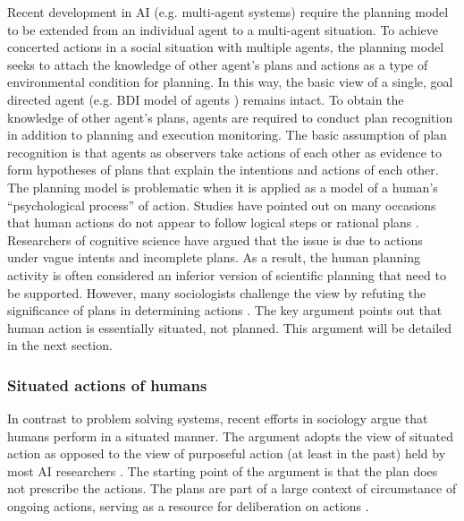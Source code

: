 
Recent development in \ac{AI} (e.g. multi-agent systems) require the planning model to be extended from an individual agent to a multi-agent situation. To achieve concerted actions in a social situation with multiple agents, the planning model seeks to attach the knowledge of other agent's plans and actions as a type of environmental condition for planning. In this way, the basic view of a single, goal directed agent (e.g. BDI model of agents \citep{Georgeff1999}) remains intact. To obtain the knowledge of other agent's plans, agents are required to conduct plan recognition in addition to planning and execution monitoring. The basic assumption of plan recognition is that agents as observers take actions of each other as evidence to form hypotheses of plans that explain the intentions and actions of each other.  \\

The planning model is problematic when it is applied as a model of a  human's ``psychological process'' of action. Studies have pointed out on many occasions that human actions do not appear to follow logical steps or rational plans \citep{Suchman1987}. Researchers of cognitive science have argued that the issue is due to actions under vague intents and incomplete plans. As a result, the human planning activity is often considered an inferior version of scientific planning that need to be supported. However, many sociologists challenge the view by refuting the significance of plans in determining actions  \citep{Suchman1987}. The key argument points out that human action is essentially situated, not planned. This argument will be detailed in the next section.\\ 

\subsubsection{Situated actions of humans}
In contrast to problem solving systems, recent efforts in sociology argue that humans perform in a situated manner. The argument adopts the view of situated action as opposed to the view of purposeful action (at least in the past) held by most \ac{AI} researchers \citep{Suchman1987}. The starting point of the argument is that the plan does not prescribe the actions. The plans are part of a large context of circumstance of ongoing actions, serving as a resource for deliberation on actions \citep{Suchman1987}.\\

